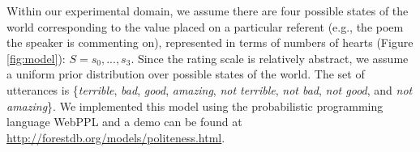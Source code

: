 \documentclass[9pt,twocolumn,twoside,lineno]{main_class_file}
\begin{document}
Within our experimental domain, we assume there are four possible states
of the world corresponding to the value placed on a particular referent
(e.g., the poem the speaker is commenting on), represented in terms of numbers of hearts (Figure \ref{fig:model}):
\(S = {s_0,...,s_3}\). Since the rating scale is relatively abstract, we assume a uniform prior distribution
over possible states of the world. The set of utterances is
\{\emph{terrible}, \emph{bad}, \emph{good}, \emph{amazing}, \emph{not
terrible}, \emph{not bad}, \emph{not good}, and \emph{not amazing}\}. We
implemented this model using the probabilistic programming language
WebPPL \cite{dippl} and a demo can be found at \url{http://forestdb.org/models/politeness.html}.



\end{document}
